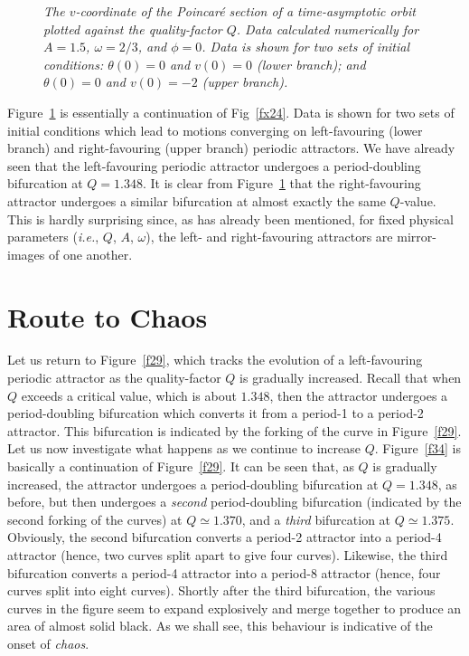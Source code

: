 \begin{figure}
\epsfysize=2.5in
\centerline{}
\caption{\em The $v$-coordinate of the Poincar\'{e} section of a time-asymptotic orbit
plotted against the quality-factor $Q$. Data
 calculated numerically for
$A=1.5$, $\omega=2/3$, and $\phi=0$. Data is shown for two sets of initial
conditions: $\theta(0)=0$ and $v(0)=0$ (lower branch); and $\theta(0)=0$ and $v(0)=-2$ (upper branch).}\label{f32}
\end{figure}

Figure~\ref{f32} is essentially a continuation of Fig~\ref{fx24}. Data is shown for two
sets of initial conditions which lead to motions converging on left-favouring (lower branch) and
right-favouring (upper branch) periodic attractors. We have already seen that the left-favouring
periodic attractor undergoes a period-doubling bifurcation at $Q=1.348$. It is clear from Figure~\ref{f32}
that the right-favouring attractor undergoes a similar bifurcation at almost exactly the
same $Q$-value. This is hardly surprising since, as has already
been mentioned, for fixed physical parameters ({\em i.e.}, $Q$, $A$, $\omega$), the
left- and right-favouring attractors are mirror-images of one another.

\section{Route to Chaos}\label{spd}
Let us return to Figure~\ref{f29}, which tracks the evolution of a left-favouring
periodic attractor as the quality-factor $Q$ is gradually increased. Recall that when
$Q$ exceeds a critical value, which is about $1.348$, then the attractor
undergoes a period-doubling bifurcation which converts it from a period-1 to a period-2
attractor. This bifurcation is indicated by the forking of the curve in
Figure~\ref{f29}. Let us now investigate what happens as we continue to increase $Q$. Figure~\ref{f34} is basically
a continuation of Figure~\ref{f29}. It can be seen that, as $Q$ is gradually
increased, the attractor undergoes a period-doubling bifurcation at $Q=1.348$, as before,
but then undergoes a {\em second}\/ period-doubling bifurcation (indicated by the 
second forking of
the curves) at $Q\simeq 1.370$, and a {\em third}\/ bifurcation at $Q\simeq 1.375$. Obviously, the second bifurcation
converts a period-2 attractor into a period-4 attractor (hence, two curves split apart to
give four curves). Likewise, the third bifurcation converts a period-4 attractor
into a period-8 attractor (hence, four curves split into eight curves). 
Shortly after the third
bifurcation, the various curves in the figure seem to expand explosively and  merge together
to produce an area of almost solid black. As we shall see, this behaviour is indicative
of the onset of {\em chaos}. 
 
